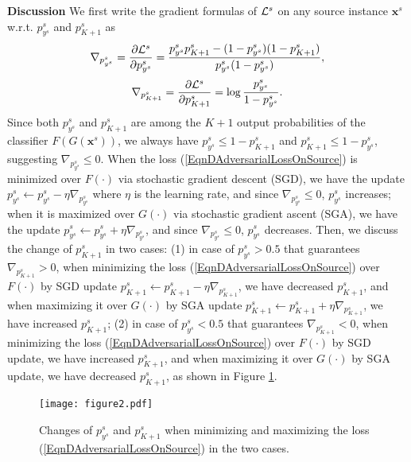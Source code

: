\documentclass[letterpaper]{article} \usepackage{aaai20}  \usepackage{times}  \usepackage{helvet} \usepackage{courier}  \usepackage[hyphens]{url}  \usepackage{graphicx} \urlstyle{rm} \def\UrlFont{\rm}  \usepackage{graphicx}  \frenchspacing  \setlength{\pdfpagewidth}{8.5in}  \setlength{\pdfpageheight}{11in}
\begin{document}
\noindent\textbf{Discussion} We first write the gradient formulas of ${\cal{L}}^s$ on any source instance $\mathbf{x}^s$ w.r.t. $p^s_{y^s}$ and $p^s_{K+1}$ as
\begin{align}
\nabla_{p_{y^s}^s} = \frac{\partial {\cal{L}}^s}{\partial p^s_{y^s}} \nonumber = \frac{p^s_{y^s}p^s_{K+1} - (1-p^s_{y^s})(1-p^s_{K+1})}{p^s_{y^s}(1 - p^s_{y^s})}, \nonumber
\end{align}
\begin{align}
\nabla_{p_{K+1}^s} = \frac{\partial {\cal{L}}^s}{\partial p^s_{K+1}} = \log \frac{p^s_{y^s}}{1-p^s_{y^s}}. \nonumber
\end{align}
Since both $p_{y^s}^s$ and $p_{K+1}^s$ are among the $K+1$ output probabilities of the classifier $F(G(\mathbf{x}^s))$, we always have $p_{y^s}^s \leq 1 - p_{K+1}^s$ and $p_{K+1}^s \leq 1 - p_{y^s}^s$, suggesting $\nabla_{p_{y^s}^s} \leq 0$. When the loss (\ref{EqnDAdversarialLossOnSource}) is minimized over $F(\cdot)$ via stochastic gradient descent (SGD), we have the update $p_{y^s}^s \leftarrow p_{y^s}^s - \eta \nabla_{p_{y^s}^s}$ where $\eta$ is the learning rate, and since $\nabla_{p_{y^s}^s} \leq 0$, $p_{y^s}^s$ increases; when it is maximized over $G(\cdot)$ via stochastic gradient ascent (SGA), we have the update $p_{y^s}^s \leftarrow p_{y^s}^s + \eta \nabla_{p_{y^s}^s}$, and since $\nabla_{p_{y^s}^s} \leq 0$,  $p_{y^s}^s$ decreases. Then, we discuss the change of $p_{K+1}^s$ in two cases: (1) in case of $p_{y^s}^s > 0.5$ that guarantees $\nabla_{p_{K+1}^s}>0$, when minimizing the loss (\ref{EqnDAdversarialLossOnSource}) over $F(\cdot)$ by SGD update $p_{K+1}^s \leftarrow p_{K+1}^s - \eta \nabla_{p_{K+1}^s}$, we have decreased $p_{K+1}^s$, and when maximizing it over $G(\cdot)$ by SGA update $p_{K+1}^s \leftarrow p_{K+1}^s + \eta \nabla_{p_{K+1}^s}$, we have increased $p_{K+1}^s$; (2) in case of $p_{y^s}^s < 0.5$ that guarantees $\nabla_{p_{K+1}^s}<0$, when minimizing the loss (\ref{EqnDAdversarialLossOnSource}) over $F(\cdot)$ by SGD update, we have increased $p_{K+1}^s$, and when maximizing it over $G(\cdot)$ by SGA update, we have decreased $p_{K+1}^s$, as shown in Figure \ref{fig:see_change}.

\begin{figure}[!ht]
	\centering
	\texttt{[image: figure2.pdf]}
	\caption{Changes of $p_{y^s}^s$ and $p_{K+1}^s$ when minimizing and maximizing the loss (\ref{EqnDAdversarialLossOnSource}) in the two cases.}
	\label{fig:see_change}
\end{figure}
\end{document}
